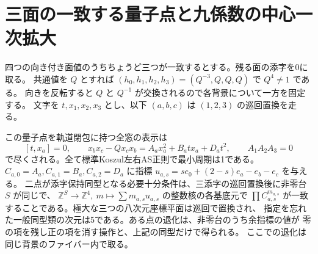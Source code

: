 \section{三面の一致する量子点と九係数の中心一次拡大}
\label{sec:quantum-triple-face}
四つの向き付き面値のうちちょうど三つが一致するとする。残る面の添字を0に取る。
共通値を $Q$ とすれば $(h_0,h_1,h_2,h_3)=(Q^{-3},Q,Q,Q)$ で $Q^4\ne1$ である。
向きを反転すると $Q$ と $Q^{-1}$ が交換されるので各背景について一方を固定する。
文字を $t,x_1,x_2,x_3$ とし、以下 $(a,b,c)$ は $(1,2,3)$ の巡回置換を走る。
\begin{theorem}\label{thm:quantum-triple-face}
この量子点を軌道閉包に持つ全窓の表示は
\[
 [t,x_a]=0,\qquad x_bx_c-Qx_cx_b=A_a x_a^2+B_a tx_a+D_a t^2,
 \qquad A_1A_2A_3=0
\]
で尽くされる。全て標準Koszul左右AS正則で最小周期は1である。
$C_{a,0}=A_a,C_{a,1}=B_a,C_{a,2}=D_a$ に指標
$u_{a,s}=se_0+(2-s)e_a-e_b-e_c$ を与える。
二点が添字保持同型となる必要十分条件は、三添字の巡回置換後に非零台 $S$ が同じで、
$\mathbb Z^S\to\mathbb Z^4,\ m\mapsto\sum m_{a,s}u_{a,s}$ の整数核の各基底元で
$\prod C_{a,s}^{m_{a,s}}$ が一致することである。極大な三つの八次元座標平面は巡回で置換され、
指定を忘れた一般同型類の次元は5である。ある点の退化は、非零台のうち余指標の値が
零の項を残し正の項を消す操作と、上記の同型だけで得られる。
ここでの退化は同じ背景のファイバー内で取る。
\end{theorem}
